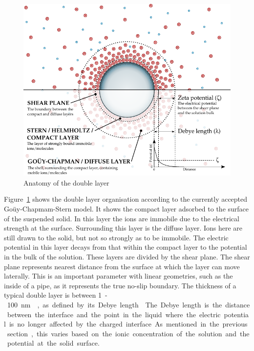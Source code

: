     \begin{figure}
      \begin{center}
        \includegraphics{content/introduction/graphics/doubleLayer_version2}
      \end{center}
      \caption{Anatomy of the double layer}
      \label{fig:doubleLayer_anatomy}
    \end{figure}
    Figure~\ref{fig:doubleLayer_anatomy} shows the double layer organisation according to the currently accepted Goüy-Chapmam-Stern model.
    It shows the compact layer adsorbed to the surface of the suspended solid.
    In this layer the ions are immobile due to the electrical strength at the surface.
    Surrounding this layer is the diffuse layer.
    Ions here are still drawn to the solid, but not so strongly as to be immobile.
    The electric potential in this layer decays from that within the compact layer to the potential in the bulk of the solution.
    These layers are divided by the shear plane.
    The shear plane represents nearest distance from the surface at which the layer can move laterally.
    This is an important parameter with linear geometries, such as the inside of a pipe, as it represents the true no-slip boundary.
    The thickness of a typical double layer is between \SI{1}-\SI{100}{\nano\meter}~\cite{Jiang2010}, as defined by its Debye length~\cite{Israelachvili2011}.
    The Debye length is the distance between the interface and the point in the liquid where the electric potential is no longer affected by the charged interface.
    As mentioned in the previous section, this varies based on the ionic concentration of the solution and the potential at the solid surface.


